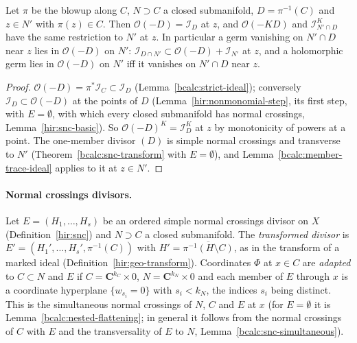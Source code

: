 \begin{corollary}
\label{bcalc:exceptional-trace-ideal}
\mixedleanok
Let \(\pi\) be the blowup along \(C\), \(N\supset C\) a closed submanifold, \(D=\pi^{-1}(C)\) and \(z\in N'\) with \(\pi(z)\in C\). Then \(\mathcal O(-D)=\mathcal I_D\) at
\(z\), and \(\mathcal O(-KD)\) and \(\mathcal I_{N'\cap D}^K\) have the same restriction to \(N'\) at \(z\). In particular a germ vanishing on \(N'\cap D\) near \(z\)
lies in \(\mathcal O(-D)\) on \(N'\): \(\mathcal I_{D\cap N'}\subset\mathcal O(-D)+\mathcal I_{N'}\) at \(z\), and a holomorphic germ lies in \(\mathcal O(-D)\) on \(N'\) iff
it vanishes on \(N'\cap D\) near \(z\).
\end{corollary}
\begin{proof}
\mixedleanok
\(\mathcal O(-D)=\pi^*\mathcal I_C\subset\mathcal I_D\) (Lemma~\ref{bcalc:strict-ideal}); conversely \(\mathcal I_D\subset\mathcal O(-D)\) at the points of \(D\)
(Lemma~\ref{hir:nonmonomial-step}, its first step, with \(E=\emptyset\), with which every closed submanifold has normal crossings, Lemma~\ref{hir:snc-basic}). So
\(\mathcal O(-D)^K=\mathcal I_D^K\) at \(z\) by monotonicity of powers at a point. The one-member divisor \((D)\) is simple normal crossings and transverse to \(N'\)
(Theorem~\ref{bcalc:snc-transform} with \(E=\emptyset\)), and Lemma~\ref{bcalc:member-trace-ideal} applies to it at \(z\in N'\).
\end{proof}

\paragraph{Normal crossings divisors.} Let \(E=(H_1,\dots,H_s)\) be an ordered simple normal crossings divisor on \(X\)
(Definition~\ref{hir:snc}) and \(N\supset C\) a closed submanifold. The \emph{transformed divisor} is
\(E'=(H_1',\dots,H_s',\pi^{-1}(C))\) with \(H'=\overline{\pi^{-1}(H\setminus C)}\), as in the transform of a marked ideal
(Definition~\ref{hir:geo-transform}). Coordinates \(\Phi\) at \(x\in C\) are \emph{adapted} to \(C\subset N\) and \(E\) if
\(C=\mathbf C^{k_C}\times0\), \(N=\mathbf C^{k_N}\times0\) and each member of \(E\) through \(x\) is a coordinate hyperplane \(\{w_{s_i}=0\}\) with
\(s_i<k_N\), the indices \(s_i\) being distinct. This is the simultaneous normal crossings of \(N\), \(C\) and \(E\) at \(x\) (for
\(E=\emptyset\) it is Lemma~\ref{bcalc:nested-flattening}; in general it follows from the normal crossings of \(C\) with \(E\) and the
transversality of \(E\) to \(N\), Lemma~\ref{bcalc:snc-simultaneous}).

